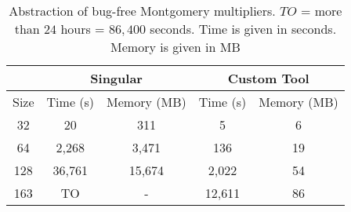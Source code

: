 \begin{table}[H]
\begin{center}
\caption{Abstraction of bug-free Montgomery multipliers. $TO$ = more than $24$ hours = $86,400$ seconds. Time is given in seconds. Memory is given in MB}
\label{tab:absmontflatresults}
\begin{tabular}{|c||c|c||c|c|} 
\hline

& \multicolumn{2}{c||}{Singular} & \multicolumn{2}{c|}{Custom Tool} \\
	\hline

Size     & Time (s)   & Memory (MB)& Time (s)   & Memory (MB)\\
\hline
32       & 20   & 311 & 5   & 6\\
\hline
64       & 2,268   & 3,471 &136   & 19\\
\hline
128      & 36,761 & 15,674& 2,022 & 54\\
\hline
163      & TO &  - & 12,611 &  86\\
\hline

\end{tabular}
\end{center}
\end{table}



